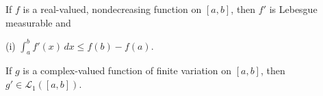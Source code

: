 If $f$ is a real-valued, nondecreasing function on $[a, b]$, then $f'$ is Lebesgue measurable and

(i) $\int_{a}^{b} f'(x) \, dx \leq f(b) - f(a)$.

If $g$ is a complex-valued function of finite variation on $[a, b]$, then $g' \in \mathcal{L}_1([a, b])$.